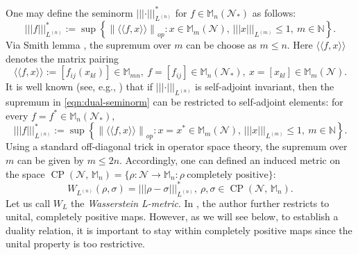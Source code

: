 \documentclass[11pt,reqno]{amsart}
\numberwithin{equation}{section}
\newcommand{\mb}{\mathbb}
\newcommand{\mc}{\mathcal}
\begin{document}
One may define the seminorm $|||\cdot|||_{L^{(n)}}^*$  for $f \in \mb M_n(\mc N_*)$ as follows:
\begin{equation}\label{eqn:dual-seminorm}
    |||f|||_{L^{(n)}}^* := \sup\left\{ \left\|\langle\!\!\!\langle f,x \rangle\!\!\!\rangle \right\|_{op} : x \in \mb M_m(\mc N),\, |||x|||_{L^{(m)}}\le 1,\ m\in \mb N \right\}.
\end{equation}
Via Smith lemma \cite{Paulsen2003}, the supremum over $m$ can be choose as $m \le n$. Here $\langle\!\!\!\langle f,x \rangle\!\!\!\rangle$ denotes the matrix pairing 
\begin{equation}
    \langle\!\!\!\langle f,x \rangle\!\!\!\rangle := \left[f_{ij}(x_{{kl}})\right] \in \mb M_{mn},\ f = [f_{ij}] \in \mb M_{n}(\mc N_*),\ x= [x_{kl}] \in \mb M_m(\mc N).
\end{equation}
It is well known (see, e.g., \cite{rieffel1999metrics}) that if $|||\cdot|||_{L^{(n)}}$ is self-adjoint invariant, then the supremum in
\eqref{eqn:dual-seminorm} can be restricted to self‑adjoint elements:
for every $f=f^{*}\in \mb M_n(\mathcal N_{*})$,
\begin{equation}\label{eqn:self adjoint dual}
  |||f|||_{L^{(n)}}^* := \sup\left\{ \left\|\langle\!\!\!\langle f,x \rangle\!\!\!\rangle \right\|_{op} : x = x^*\in \mb M_m(\mc N),\, |||x|||_{L^{(m)}}\le 1,\ m\in \mb N \right\}.
\end{equation}
Using a standard off-diagonal trick in operator space theory, the supremum over $m$ can be given by $m \le 2n$. Accordingly, one can defined an induced metric on the space $\operatorname{CP}(\mathcal N,\,\mb M_n) = \{\rho: \mc N \to \mb M_n: \rho\ \text{completely\ positive}\}$: 
\begin{equation}\label{def:distance selfadjoint}
    W_{L^{(n)}}(\rho,\sigma) =|||\rho - \sigma|||_{L^{(n)}}^*,\ \rho,\sigma \in \operatorname{CP}(\mathcal N,\,\mb M_n). 
\end{equation}
Let us call $W_{L}$ the \emph{Wasserstein L-metric}. In \cite{wu2005noncommutativemetricsmatrixstate}, the author further restricts to unital, completely positive maps. However, as we will see below, to establish a duality relation, it is important to stay within completely positive maps since the unital property is too restrictive.
\end{document}
